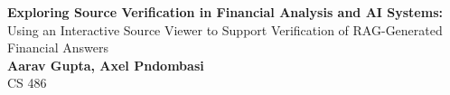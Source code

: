 \begin{titlepage}
    \begin{center}
    {\fontsize{40}{48}\selectfont \bfseries Exploring Source Verification in Financial Analysis and AI Systems:}
    \\\vspace{20pt}
    {\LARGE Using an Interactive Source Viewer to Support Verification of RAG-Generated Financial Answers} \\
    \vspace{20pt}
    \textbf{Aarav Gupta, Axel Pndombasi}
    \vspace{8pt}
    \\ CS 486
    \end{center}
\end{titlepage}
